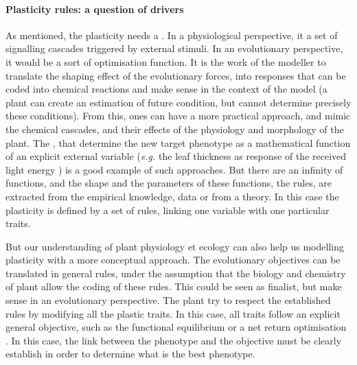 \paragraph{Plasticity rules: a question of drivers}

As mentioned, the plasticity needs a . In a physiological perspective, it a set of signalling cascades triggered by external stimuli. In an evolutionary perspective, it would be a sort of optimisation function. It is the work of the modeller to translate the shaping effect of the evolutionary forces, into responses that can be coded into chemical reactions and make sense in the context of the model (a plant can create an estimation of future condition, but cannot determine precisely these conditions). From this, ones can have a more practical approach, and mimic the chemical cascades, and their effects of the physiology and morphology of the plant. The , that determine the new target phenotype as a mathematical function of an explicit external variable (\textit{e.g.} the leaf thickness as response of the received light energy \parencite{feller_mathematical_2015}) is a good example of such approaches. But there are an infinity of functions, and the shape and the parameters of these functions, the rules, are extracted from the empirical knowledge, data or from a theory. In this case the plasticity is defined by a set of rules, linking one variable with one particular traits.

But our understanding of plant physiology et ecology can also help us modelling plasticity with a more conceptual approach. The evolutionary objectives can be translated in general rules, under the assumption that the biology and chemistry of plant allow the coding of these rules. This could be seen as finalist, but make sense in an evolutionary perspective. The plant try to respect the established rules by modifying all the plastic traits. In this case, all traits follow an explicit general objective, such as the functional equilibrium \cite{hirose_vegetative_1987, lohier_explaining_2014} or a net return optimisation \cite{mcmurtrie_leaf-trait_2011}. In this case, the link between the phenotype and the objective must be clearly establish in order to determine what is the best phenotype.

